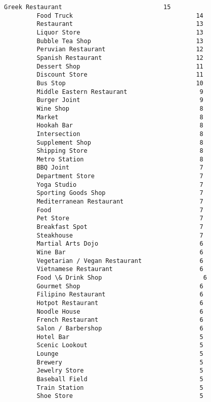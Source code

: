 \documentclass[11pt]{article}
\begin{document}
\begin{Verbatim}[commandchars=\\\{\}]
         Greek Restaurant                            15
         Food Truck                                  14
         Restaurant                                  13
         Liquor Store                                13
         Bubble Tea Shop                             13
         Peruvian Restaurant                         12
         Spanish Restaurant                          12
         Dessert Shop                                11
         Discount Store                              11
         Bus Stop                                    10
         Middle Eastern Restaurant                    9
         Burger Joint                                 9
         Wine Shop                                    8
         Market                                       8
         Hookah Bar                                   8
         Intersection                                 8
         Supplement Shop                              8
         Shipping Store                               8
         Metro Station                                8
         BBQ Joint                                    7
         Department Store                             7
         Yoga Studio                                  7
         Sporting Goods Shop                          7
         Mediterranean Restaurant                     7
         Food                                         7
         Pet Store                                    7
         Breakfast Spot                               7
         Steakhouse                                   7
         Martial Arts Dojo                            6
         Wine Bar                                     6
         Vegetarian / Vegan Restaurant                6
         Vietnamese Restaurant                        6
         Food \& Drink Shop                            6
         Gourmet Shop                                 6
         Filipino Restaurant                          6
         Hotpot Restaurant                            6
         Noodle House                                 6
         French Restaurant                            6
         Salon / Barbershop                           6
         Hotel Bar                                    5
         Scenic Lookout                               5
         Lounge                                       5
         Brewery                                      5
         Jewelry Store                                5
         Baseball Field                               5
         Train Station                                5
         Shoe Store                                   5

\end{Verbatim}
\end{document}

